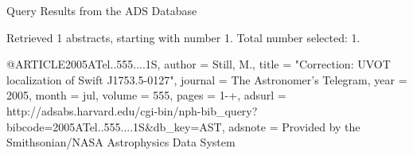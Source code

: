 Query Results from the ADS Database


Retrieved 1 abstracts, starting with number 1.  Total number selected: 1.

@ARTICLE{2005ATel..555....1S,
   author = {{Still}, M.},
    title = "{Correction: UVOT localization of Swift J1753.5-0127}",
  journal = {The Astronomer's Telegram},
     year = 2005,
    month = jul,
   volume = 555,
    pages = {1-+},
   adsurl = {http://adsabs.harvard.edu/cgi-bin/nph-bib_query?bibcode=2005ATel..555....1S&db_key=AST},
  adsnote = {Provided by the Smithsonian/NASA Astrophysics Data System}
}


